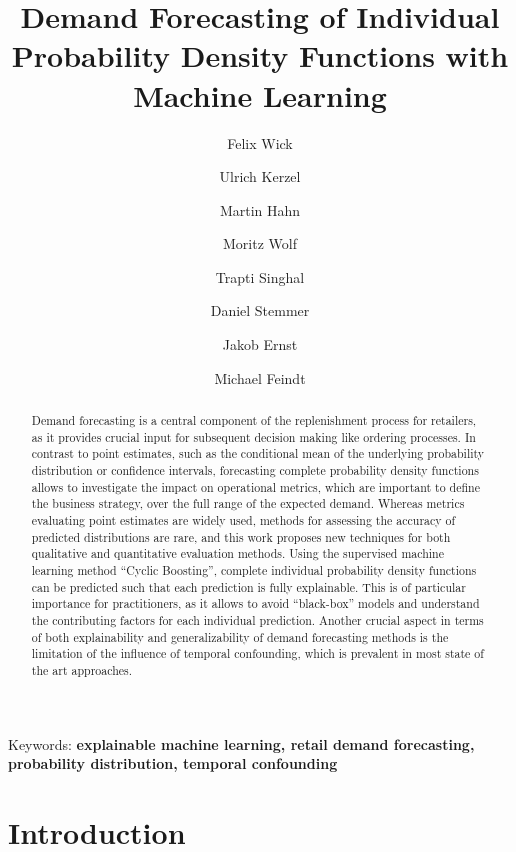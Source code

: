 \documentclass[BCOR=1mm, DIV=calc,10pt,
twoside=true,
twocolumn,
headings=normal]{scrartcl}
\begin{document}
\title{Demand Forecasting of Individual Probability Density Functions with Machine Learning}

\author[1]{Felix Wick}
\author[3]{Ulrich Kerzel}
\author[1]{Martin Hahn}
\author[1]{Moritz Wolf}
\author[2]{Trapti Singhal}
\author[1]{Daniel Stemmer}
\author[1]{Jakob Ernst}
\author[1]{Michael Feindt}

\date{}

\maketitle


\begin{abstract}

Demand forecasting is a central component of the replenishment process for retailers, as it provides crucial input for subsequent decision making like ordering processes. In contrast to point estimates, such as the conditional mean of the underlying probability distribution or confidence intervals, forecasting complete probability density functions allows to investigate the impact on operational metrics, which are important to define the business strategy, over the full range of the expected demand. Whereas metrics evaluating point estimates are widely used, methods for assessing the accuracy of predicted distributions are rare, and this work proposes new techniques for both qualitative and quantitative evaluation methods. Using the supervised machine learning method ``Cyclic Boosting'', complete individual probability density functions can be predicted such that each prediction is fully explainable. This is of particular importance for practitioners, as it allows to avoid ``black-box'' models and understand the contributing factors for each individual prediction. Another crucial aspect in terms of both explainability and generalizability of demand forecasting methods is the limitation of the influence of temporal confounding, which is prevalent in most state of the art approaches.

\end{abstract}

{Keywords: \textbf{explainable machine learning, retail demand forecasting, probability distribution, temporal confounding}}


\section{Introduction}
\label{sec:Intro}
\end{document}
